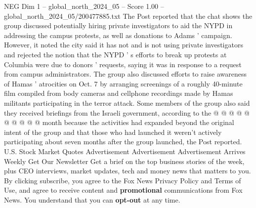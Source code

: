 \begin{textsample}{NEG Dim 1 – global\_north\_2024\_05 – Score 1.00 – global\_north\_2024\_05/200477885.txt}
The Post reported that the chat shows the group discussed potentially hiring private investigators to aid the NYPD in addressing the campus protests, as well as donations to Adams ' campaign.
However, it noted the city said it has not and is not using private investigators and rejected the notion that the NYPD ' s efforts to break up protests at Columbia were due to donors ' requests, saying it was in response to a request from campus administrators.
The group also discussed efforts to raise awareness of Hamas ' atrocities on Oct. 7 by arranging screenings of a roughly 40-minute film compiled from body cameras and cellphone recordings made by Hamas militants participating in the terror attack.
Some members of the group also said they received briefings from the Israeli government, according to the @ @ @ @ @ @ @ @ @ @ month because the activities had expanded beyond the original intent of the group and that those who had launched it weren't actively participating about seven months after the group launched, the Post reported.
U.S.
Stock Market Quotes Advertisement Advertisement Advertisement Arrives Weekly Get Our Newsletter Get a brief on the top business stories of the week, plus CEO interviews, market updates, tech and money news that matters to you.
By clicking subscribe, you agree to the Fox News Privacy Policy and Terms of Use, and agree to receive content and \textbf{promotional} communications from Fox News.
You understand that you can \textbf{opt-out} at any time.

\end{textsample}
